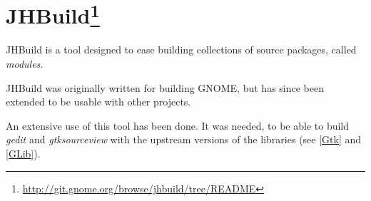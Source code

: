 
\section[JHBuild]{JHBuild\footnote{\url{http://git.gnome.org/browse/jhbuild/tree/README}}}\label{jhbuild}

JHBuild is a tool designed to ease building collections of source packages, called \emph{modules}.

JHBuild was originally written for building GNOME, but has since been extended to be usable with other projects.

An extensive use of this tool has been done. It was needed, to be able to build \emph{gedit} and \emph{gtksourceview} with the upstream versions of the libraries (see \ref{Gtk} and \ref{GLib}).
